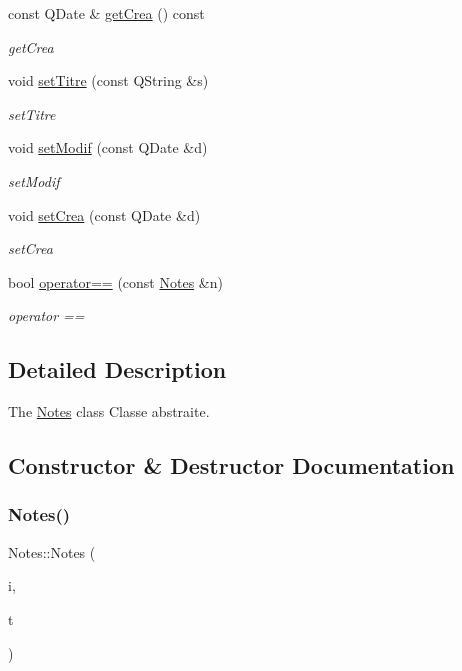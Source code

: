 \begin{DoxyCompactItemize}
const Q\+Date \& \hyperlink{class_notes_a0e396bd4a81ceaa93e7f7d829a3047e2}{get\+Crea} () const
\begin{DoxyCompactList}\small\item\em get\+Crea \end{DoxyCompactList}\item 
void \hyperlink{class_notes_a31e62febfc96b4b1a4ed33647c193f93}{set\+Titre} (const Q\+String \&s)
\begin{DoxyCompactList}\small\item\em set\+Titre \end{DoxyCompactList}\item 
void \hyperlink{class_notes_a903b6acb849c7aa9ba25161106f31299}{set\+Modif} (const Q\+Date \&d)
\begin{DoxyCompactList}\small\item\em set\+Modif \end{DoxyCompactList}\item 
void \hyperlink{class_notes_aade3f1a559f3df47181b746a47e93a72}{set\+Crea} (const Q\+Date \&d)
\begin{DoxyCompactList}\small\item\em set\+Crea \end{DoxyCompactList}\item 
bool \hyperlink{class_notes_abf74367554c664c909f14f752a544384}{operator==} (const \hyperlink{class_notes}{Notes} \&n)
\begin{DoxyCompactList}\small\item\em operator == \end{DoxyCompactList}\end{DoxyCompactItemize}


\subsection{Detailed Description}
The \hyperlink{class_notes}{Notes} class Classe abstraite. 

\subsection{Constructor \& Destructor Documentation}
\mbox{\label{class_notes_aff3e54629e3e1005aafc512f87c8aa8f}} 
\subsubsection{\texorpdfstring{Notes()}{Notes()}\hspace{0.1cm}{\footnotesize\ttfamily [1/2]}}
{\footnotesize\ttfamily Notes\+::\+Notes (\begin{DoxyParamCaption}\item[{const Q\+String}]{i,  }\item[{const Q\+String}]{t }\end{DoxyParamCaption})\hspace{0.3cm}{\ttfamily [inline]}}



